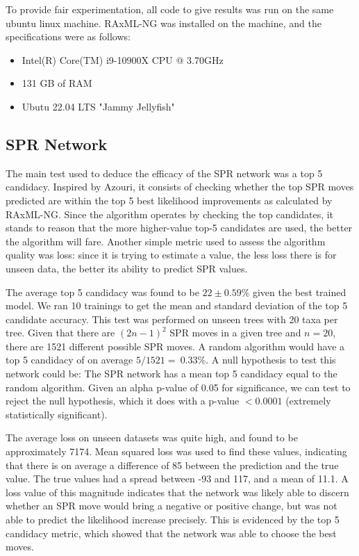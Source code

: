 \documentclass{mpaper}
\begin{document}
To provide fair experimentation, all code to give results was run on the same ubuntu linux machine. RAxML-NG was installed on the machine, and the specifications were as follows: 
\begin{itemize}
    \item Intel(R) Core(TM) i9-10900X CPU @ 3.70GHz
    \item 131 GB of RAM
    \item Ubutu 22.04 LTS "Jammy Jellyfish"
\end{itemize}

\subsection{SPR Network}

The main test used to deduce the efficacy of the SPR network was a top 5 candidacy. Inspired by Azouri, it consists of checking whether the top SPR moves predicted are within the top 5 best likelihood improvements as calculated by RAxML-NG. Since the algorithm operates by checking the top candidates, it stands to reason that the more higher-value top-5 candidates are used, the better the algorithm will fare. Another simple metric used to assess the algorithm quality was loss: since it is trying to estimate a value, the less loss there is for unseen data, the better its ability to predict SPR values.

The average top 5 candidacy was found to be $22\pm 0.59 \%$ given the best trained model. We ran 10 trainings to get the mean and standard deviation of the top 5 candidate accuracy. This test was performed on unseen trees with 20 taxa per tree. Given that there are $(2n-1)^2$ SPR moves in a given tree and $n=20$, there are 1521 different possible SPR moves. A random algorithm would have a top 5 candidacy of on average $5/1521 = ~0.33\%$. A null hypothesis to test this network could be: The SPR network has a mean top 5 candidacy equal to the random algorithm. Given an alpha p-value of 0.05 for significance, we can test to reject the null hypothesis, which it does with a p-value $< 0.0001$ (extremely statistically significant).

The average loss on unseen datasets was quite high, and found to be approximately 7174. Mean squared loss was used to find these values, indicating that there is on average a difference of 85 between the prediction and the true value. The true values had a spread between -93 and 117, and a mean of 11.1. A loss value of this magnitude indicates that the network was likely able to discern whether an SPR move would bring a negative or positive change, but was not able to predict the likelihood increase precisely. This is evidenced by the top 5 candidacy metric, which showed that the network was able to choose the best moves.
\end{document}
